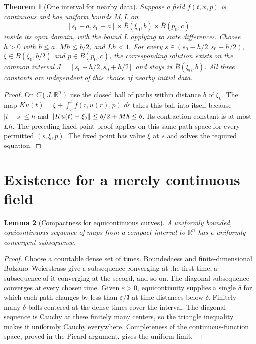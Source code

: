 \documentclass[11pt,oneside]{book}
\newtheorem{theorem}{Theorem}[chapter]
\newtheorem{lemma}[theorem]{Lemma}
\theoremstyle{definition}
\theoremstyle{remark}\newtheorem{remark}[theorem]{Remark}
\newcommand{\R}{\mathbb R}\newcommand{\C}{\mathbb C}
\newcommand{\dd}{\,d}\newcommand{\id}{\operatorname{id}}
\begin{document}
\begin{theorem}[One interval for nearby data]\label{d13:03:uniform-box}
Suppose a field $f(t,x,p)$ is continuous and has uniform bounds $M,L$
on
\[
 [s_0-a,s_0+a]\times\overline B(\xi_0,b)\times\overline B(p_0,c)
\]
inside its open domain, with the bound $L$ applying to state differences.
Choose $h>0$ with $h\leq a$, $Mh\leq b/2$, and $Lh<1$.
For every $s\in(s_0-h/2,s_0+h/2)$,
$\xi\in B(\xi_0,b/2)$ and $p\in B(p_0,c)$, the corresponding solution
exists on the common interval $J=[s_0-h/2,s_0+h/2]$ and stays in
$\overline B(\xi_0,b)$. All three constants are independent of this
choice of nearby initial data.
\end{theorem}
\begin{proof}
On $C(J,\R^n)$ use the closed ball of paths within distance $b$ of
$\xi_0$. The map
$Ku(t)=\xi+\int_s^t f(r,u(r),p)\,\dd r$ takes this ball into itself
because $|t-s|\leq h$ and
$\lVert Ku(t)-\xi_0\rVert\leq b/2+Mh\leq b$.
Its contraction constant is at most $Lh$. The preceding fixed-point
proof applies on this same path space for every permitted $(s,\xi,p)$.
The fixed point has value $\xi$ at $s$ and solves the required equation.
\end{proof}

\section{Existence for a merely continuous field}
\begin{lemma}[Compactness for equicontinuous curves]\label{d13:03:ascoli}
A uniformly bounded, equicontinuous sequence of maps from a compact
interval to $\R^n$ has a uniformly convergent subsequence.
\end{lemma}
\begin{proof}
Choose a countable dense set of times. Boundedness and finite-dimensional
Bolzano--Weierstrass give a subsequence converging at the first time,
a subsequence of it converging at the second, and so on. The diagonal
subsequence converges at every chosen time. Given $\varepsilon>0$,
equicontinuity supplies a single $\delta$ for which each path changes by
less than $\varepsilon/3$ at time distances below $\delta$. Finitely
many $\delta$-balls centered at the dense times cover the interval.
The diagonal sequence is Cauchy at these finitely many centers, so the
triangle inequality makes it uniformly Cauchy everywhere. Completeness
of the continuous-function space, proved in the Picard argument, gives
the uniform limit.
\end{proof}
\end{document}
